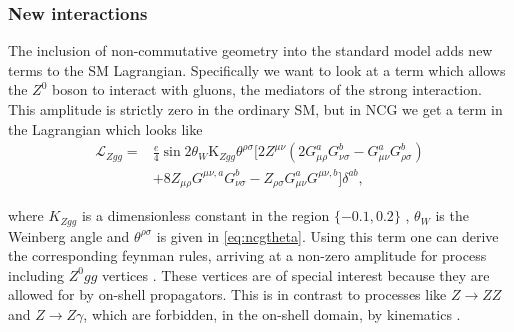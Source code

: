 \subsubsection{New interactions}
The inclusion of non-commutative geometry into the standard model adds new terms to the SM Lagrangian. Specifically we want to look at a term which allows the $Z^0$ boson to interact with gluons, the mediators of the strong interaction. This amplitude is strictly zero in the ordinary SM, but in NCG we get a term in the Lagrangian which looks like \cite{melic2005smn}
\begin{align} \label{eq:zggterm}
	\mathcal{L}_{Zgg} = &\frac{e}{4}\sin{2\theta_W}\textrm{K}_{Zgg}\theta^{\rho\sigma}
	[2 Z^{\mu\nu} (2 G_{\mu\rho}^a G_{\nu\sigma}^b - G_{\mu\nu}^a G_{\rho\sigma}^b) \nonumber \\
	 &+ 8 Z_{\mu\rho} G^{\mu\nu,a} G_{\nu\sigma}^b - Z_{\rho\sigma} G_{\mu\nu}^a G^{\mu\nu,b}
	] \delta^{ab},
\end{align}

where $K_{Zgg}$ is a dimensionless constant in the region $\{-0.1,0.2\}$ \cite{behr2003dnc}, $\theta_W$ is the Weinberg angle and $\theta^{\rho\sigma}$ is given in \eqref{eq:ncgtheta}. Using this term one can derive the corresponding feynman rules, arriving at a non-zero amplitude for process including $Z^0gg$ vertices \cite{melic2005smn}. These vertices are of special interest because they are allowed for by on-shell propagators. This is in contrast to processes like $Z \rightarrow ZZ$ and $Z \rightarrow Z\gamma$, which are forbidden, in the on-shell domain, by kinematics \cite{behr2003dnc}.